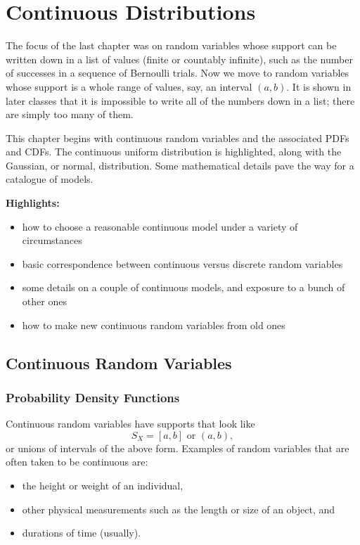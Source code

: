 \chapter{Continuous Distributions}
\label{sec-6}

\noindent
The focus of the last chapter was on random variables whose support
can be written down in a list of values (finite or countably
infinite), such as the number of successes in a sequence of Bernoulli
trials. Now we move to random variables whose support is a whole range
of values, say, an interval \((a,b)\). It is shown in later classes
that it is impossible to write all of the numbers down in a list;
there are simply too many of them.

This chapter begins with continuous random variables and the
associated PDFs and CDFs.
The continuous uniform distribution is
highlighted, along with the Gaussian, or normal, distribution. Some
mathematical details pave the way for a catalogue of models.

\textbf{Highlights:}
\begin{itemize}
\item how to choose a reasonable continuous model under a variety of
circumstances
\item basic correspondence between continuous versus discrete random
variables
\item some details on a couple of continuous models, and exposure to a
bunch of other ones
\item how to make new continuous random variables from old ones
\end{itemize}

\section{Continuous Random Variables}
\label{sec-6-1}

\subsection{Probability Density Functions}
\label{sec-6-1-1}

Continuous random variables have supports that look like
\begin{equation}
S_{X}=[a,b]\mbox{ or }(a,b),
\end{equation}
or unions of intervals of the above form. Examples of random variables
that are often taken to be continuous are:

\begin{itemize}
\item the height or weight of an individual,
\item other physical measurements such as the length or size of an object,
and
\item durations of time (usually).
\end{itemize}

